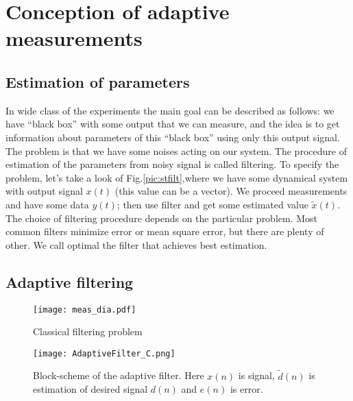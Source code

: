 \section{Conception of adaptive measurements}\label{sec:concept}
\subsection{Estimation of parameters}
In wide class of the experiments the main goal can be described as follows: we have ``black box'' with some output that we can measure, and the idea is to get information about parameters of this ``black box'' using only this output signal. The problem is that we have some noises acting on our system. The procedure of estimation of the parameters from noisy signal is called filtering. To specify the problem, let's take a look of Fig.\ref{pic:stfilt},where we have some dynamical system with output signal $x(t)$ (this value can be a vector). We proceed measurements and have some data $y(t)$; then use filter and get some estimated value $\tilde{x}(t)$. 
The choice of filtering procedure depends on the particular problem. Most common filters minimize error or mean square error, but there are plenty of other.  
We call optimal the filter that achieves best estimation. 
\subsection{Adaptive filtering}

\begin{figure}
\vspace{-5ex}
\begin{minipage}{0.6\linewidth}
\texttt{[image: meas\_dia.pdf]}
\caption{Classical filtering problem}
\label{pic:stfilt}
\end{minipage}
\hfill
\begin{minipage}[h]{0.4\linewidth}
\texttt{[image: AdaptiveFilter\_C.png]}
\caption{\footnotesize Block-scheme of the adaptive filter. Here $x(n)$ is signal, $\tilde{d}(n)$ is estimation of desired signal $d(n)$ and $e(n)$ is error.}
\label{pic:ad1}
\end{minipage}
\end{figure}

